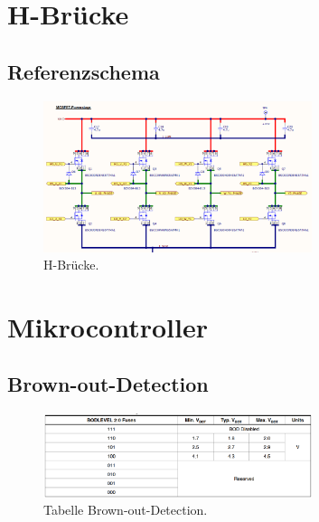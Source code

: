 \begin{appendix}
\newpage

\section{H-Brücke}\label{Appendix:H_Bruecke}

\subsection{Referenzschema}

\begin{figure}[h!]
	\centering
	\includegraphics[width=0.7\textwidth]{graphics/Referenzschema_10A70V}
	\caption{H-Brücke.}
	\label{fig:Schema_H_Bruecke_und_BLDC_Ref}
\end{figure}


\section{Mikrocontroller}\label{Appendix:Mikrocontroller}

\subsection{Brown-out-Detection}\label{Appendix:Brown-out-Detection}

\begin{figure}[h!]
	\centering
	\includegraphics[width=0.7\textwidth]{graphics/Tabelle_BoD}
	\caption{Tabelle Brown-out-Detection.}
	\label{fig:Tabelle_BoD}
\end{figure}



\end{appendix}
